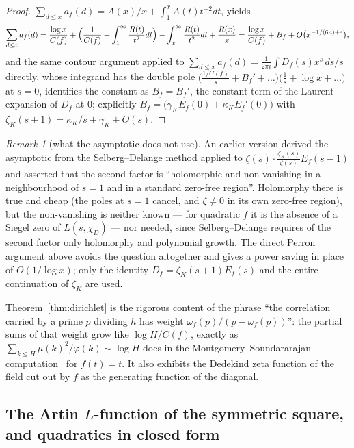 \documentclass[11pt,a4paper]{article}
\theoremstyle{remark}\newtheorem{remark}[theorem]{Remark}
\begin{document}
\begin{proof}
$\sum_{d\le x}a_f(d)=A(x)/x+\int_1^xA(t)t^{-2}dt$, yields
\[
\sum_{d\le x}a_f(d)=\frac{\log x}{C(f)}+\Bigl(\frac1{C(f)}+\int_1^\infty\frac{R(t)}{t^2}dt\Bigr)
-\int_x^\infty\frac{R(t)}{t^2}dt+\frac{R(x)}x
=\frac{\log x}{C(f)}+B_f+O\bigl(x^{-1/(6n)+\varepsilon}\bigr),
\]
and the same contour argument applied to $\sum_{d\le x}a_f(d)=\frac1{2\pi i}\int D_f(s)x^s\,ds/s$ directly, whose
integrand has the double pole $\bigl(\frac{1/C(f)}s+B_f'+\dots\bigr)\bigl(\frac1s+\log x+\dots\bigr)$ at $s=0$,
identifies the constant as $B_f=B_f'$, the constant term of the Laurent expansion of $D_f$ at $0$; explicitly
$B_f=\bigl(\gamma_KE_f(0)+\kappa_KE_f'(0)\bigr)$ with $\zeta_K(s+1)=\kappa_K/s+\gamma_K+O(s)$.
\end{proof}

\begin{remark}[what the asymptotic does not use]\label{rem:noselbergdelange}
An earlier version derived the asymptotic from the Selberg--Delange method applied to
$\zeta(s)\cdot\frac{\zeta_K(s)}{\zeta(s)}E_f(s-1)$ and asserted that the second factor is ``holomorphic and
non-vanishing in a neighbourhood of $s=1$ and in a standard zero-free region''. Holomorphy there is true and cheap
(the poles at $s=1$ cancel, and $\zeta\ne0$ in its own zero-free region), but the non-vanishing is neither known
--- for quadratic $f$ it is the absence of a Siegel zero of $L(s,\chi_D)$ --- nor needed, since Selberg--Delange
requires of the second factor only holomorphy and polynomial growth. The direct Perron argument above avoids the
question altogether and gives a power saving in place of $O(1/\log x)$; only the identity
$D_f=\zeta_K(s+1)E_f(s)$ and the entire continuation of $\zeta_K$ are used.
\end{remark}

Theorem~\ref{thm:dirichlet} is the rigorous content of the phrase ``the correlation carried by a prime
$p$ dividing $h$ has weight $\omega_f(p)/(p-\omega_f(p))$'': the partial sums of that weight grow like
$\log H/C(f)$, exactly as $\sum_{k\le H}\mu(k)^2/\varphi(k)\sim\log H$ does in the
Montgomery--Soundararajan computation~\cite{MontgomerySoundararajan2004} for $f(t)=t$. It also exhibits
the Dedekind zeta function of the field cut out by $f$ as the generating function of the diagonal.

\subsection{The Artin $L$-function of the symmetric square, and quadratics in closed form}\label{sec:artin}
\end{document}
